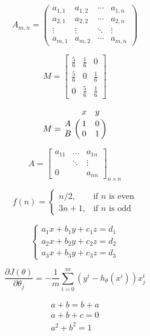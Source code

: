 \documentclass{article}
\begin{document}
	$$
	A_{m,n} = 
	\begin{pmatrix}
		a_{1,1} & a_{1,2} & \cdots & a_{1,n} \\
		a_{2,1} & a_{2,2} & \cdots & a_{2,n} \\
		\vdots  & \vdots  & \ddots & \vdots  \\
		a_{m,1} & a_{m,2} & \cdots & a_{m,n} 
	\end{pmatrix}
	$$
	
	$$
	M = \begin{bmatrix}
		\frac{5}{6} & \frac{1}{6} & 0           \\[0.3em]
		\frac{5}{6} & 0           & \frac{1}{6} \\[0.3em]
		0           & \frac{5}{6} & \frac{1}{6}
	\end{bmatrix}
	$$
	
	$$
	M = \bordermatrix{~ & x & y \cr
		A & 1 & 0 \cr
		B & 0 & 1 \cr}
	$$

	$$
	A = \begin{bmatrix}
	a_{11} & \dots & a_{1n} \\
	& \ddots & \vdots \\
	0 & & a_{nn}
	\end{bmatrix}_{n \times n}
	$$
	
	$$
	f(n) =
	\begin{cases}
	n/2,  & \text{if $n$ is even} \\
	3n+1, & \text{if $n$ is odd}
	\end{cases}
	$$
	
	
	$$
	\left\{ 
	\begin{array}{c}
	a_1x+b_1y+c_1z=d_1 \\ 
	a_2x+b_2y+c_2z=d_2 \\ 
	a_3x+b_3y+c_3z=d_3
	\end{array}
	\right. 
	$$
	
	$$
	\frac{\partial J(\theta)}{\partial\theta_j}=-\frac1m\sum_{i=0}^m(y^i-h_\theta(x^i))x^i_j
	$$
	
	\begin{gather}
	a + b = b + a \\
	a + b + c = 0 \\
	a^2 + b^2 = 1
	\end{gather}
	
		
\end{document}
